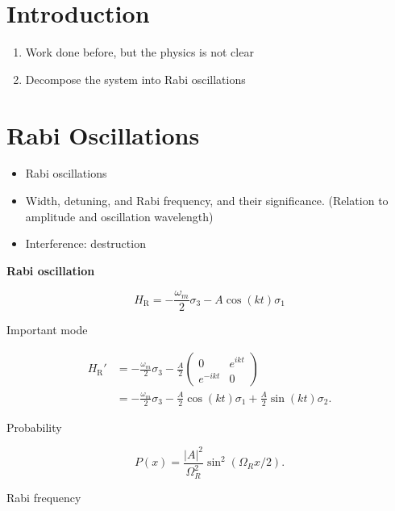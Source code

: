 \documentclass[%
preprint,
 amsmath,amssymb,
 aps,
]{revtex4-1}
\begin{document}

\section{\label{introduction}Introduction}

\begin{enumerate}
    \item Work done before, but the physics is not clear
    \item Decompose the system into Rabi oscillations
\end{enumerate}


\section{\label{rabi}Rabi Oscillations}



\begin{itemize}
    \item Rabi oscillations
    \item Width, detuning, and Rabi frequency, and their significance. (Relation to amplitude and oscillation wavelength)
    \item Interference: destruction
\end{itemize}


{\bf Rabi oscillation}

\begin{equation}
H_{\mathrm R} = -\frac{\omega_m}{2} \sigma_3 - A \cos(k t) \sigma_1
\end{equation}

Important mode

\begin{align}
H_{\mathrm R}' &= -\frac{\omega_m}{2} \sigma_3 - \frac{A}{2} \begin{pmatrix}0 & e^{i k t} \\ e^{-i k t} & 0 \end{pmatrix} \\
& =  -\frac{\omega_m}{2} \sigma_3 - \frac{A}{2} \cos(kt) \sigma_1 + \frac{A}{2} \sin (kt) \sigma_2.
\end{align}

Probability

\begin{equation}
P(x) = \frac{\lvert A\rvert^2}{ \Omega_R^2 }  \sin^2 \left( \Omega_R x/2 \right).
\end{equation}

Rabi frequency
\end{document}
